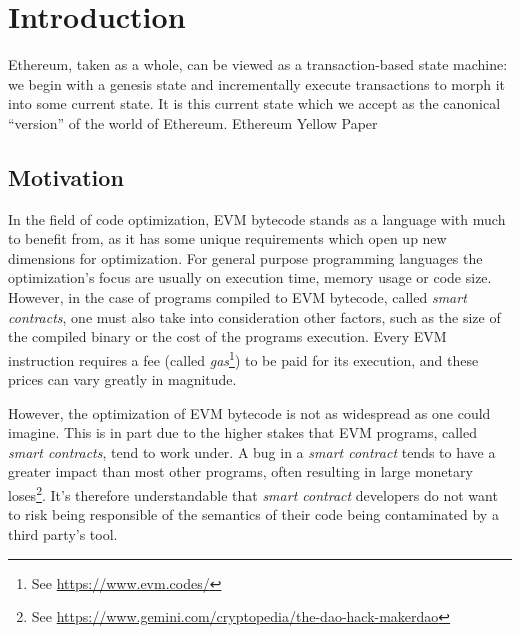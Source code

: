 \chapter{Introduction}
\label{cap:introduction}

\chapterquote
{Ethereum, taken as a whole, can be viewed as a transaction-based state machine: we begin with a genesis state and incrementally execute transactions to morph it into some current state. It is this current state which we accept as the canonical “version” of the world of Ethereum.}
{Ethereum Yellow Paper}

\section{Motivation}
\label{sect:motivation}



In the field of code optimization, EVM bytecode stands as a language with much to benefit from, as it
has some unique requirements which open up new dimensions for optimization. For general purpose
programming languages the optimization's focus are usually on execution time, memory usage or code size.
However, in the case of programs compiled to EVM bytecode, called \emph{smart contracts}, one must also
take into consideration other factors, such as the size of the compiled binary or the cost of the
programs execution. Every EVM instruction requires a fee (called \emph{gas}\footnote{See 
\url{https://www.evm.codes/}}) to be paid for its execution, and these prices can vary greatly in 
magnitude.


However, the optimization of EVM bytecode is not as widespread as one could imagine. This is in part
due to the higher stakes that EVM programs, called \emph{smart contracts}, tend to work under. A bug
in a \emph{smart contract} tends to have a greater impact than most other programs, often resulting
in large monetary loses\footnote{See \url{https://www.gemini.com/cryptopedia/the-dao-hack-makerdao}}.
It's therefore understandable that \emph{smart contract} developers do not want to risk
being responsible of the semantics of their code being contaminated by a third party's tool.

